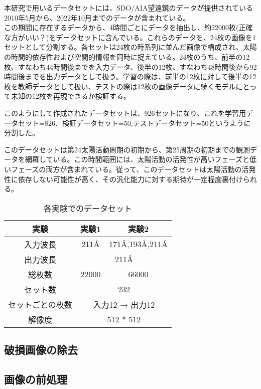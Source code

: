 本研究で用いるデータセットには、SDO/AIA望遠鏡のデータが提供されている2010年5月から、2022年10月までのデータが含まれている。\\
この期間に存在するデータから、4時間ごとにデータを抽出し、約22000枚(正確な方がいい？)をデータセットに含んでいる。これらのデータを、24枚の画像を1セットとして分割する。各セットは24枚の時系列に並んだ画像で構成され、太陽の時間的依存性および空間的情報を同時に捉えている。24枚のうち、前半の12枚、すなわち44時間後までを入力データ、後半の12枚、すなわち48時間後から92時間後までを出力データとして扱う。学習の際は、前半の12枚に対して後半の12枚を教師データとして扱い、テストの際は12枚の画像データに続くモデルにとって未知の12枚を再現できるか検証する。

このようにして作成されたデータセットは、926セットになり、これを学習用データセット=826、検証データセット=50,テストデータセット=50というように分割した。

このデータセットは第24太陽活動周期の初期から、第25周期の初期までの観測データを網羅している。この時間範囲には、太陽活動の活発性が高いフェーズと低いフェーズの両方が含まれている。従って、このデータセットは太陽活動の活発性に依存しない可能性が高く、その汎化能力に対する期待が一定程度裏付けられる。

\begin{table}[h]
    \centering
    \begin{tabular}{|c|c|c|}
    \hline
    実験 & 実験1 & 実験2 \\
    \hline\hline
    入力波長 & 211Å & 171Å,193Å,211Å \\
    \hline
    出力波長 & \multicolumn{2}{c|}{211Å} \\
    \hline
    総枚数 & 22000 & 66000 \\
    \hline
    セット数 & \multicolumn{2}{c|}{232} \\
    \hline
    セットごとの枚数 & \multicolumn{2}{c|}{入力12 → 出力12} \\
    \hline
    解像度 & \multicolumn{2}{c|}{512 * 512} \\
    \hline
    \end{tabular}
    \caption{各実験でのデータセット}
    \label{tab:my_label}
\end{table}

\subsection{破損画像の除去}
\subsection{画像の前処理}



